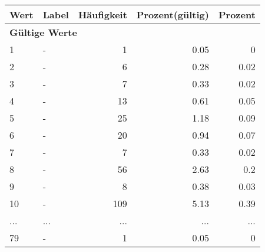      \begin{longtable}{lXrrr}
     \toprule
     \textbf{Wert} & \textbf{Label} & \textbf{Häufigkeit} & \textbf{Prozent(gültig)} & \textbf{Prozent} \\
     \endhead
     \midrule
     \multicolumn{5}{l}{\textbf{Gültige Werte}}\\
        1 & \multicolumn{1}{X}{-} & %
          \num{1} &
          \num[round-mode=places,round-precision=2]{0.05} &
          \num[round-mode=places,round-precision=2]{0} \\
        2 & \multicolumn{1}{X}{-} & %
          \num{6} &
          \num[round-mode=places,round-precision=2]{0.28} &
          \num[round-mode=places,round-precision=2]{0.02} \\
        3 & \multicolumn{1}{X}{-} & %
          \num{7} &
          \num[round-mode=places,round-precision=2]{0.33} &
          \num[round-mode=places,round-precision=2]{0.02} \\
        4 & \multicolumn{1}{X}{-} & %
          \num{13} &
          \num[round-mode=places,round-precision=2]{0.61} &
          \num[round-mode=places,round-precision=2]{0.05} \\
        5 & \multicolumn{1}{X}{-} & %
          \num{25} &
          \num[round-mode=places,round-precision=2]{1.18} &
          \num[round-mode=places,round-precision=2]{0.09} \\
        6 & \multicolumn{1}{X}{-} & %
          \num{20} &
          \num[round-mode=places,round-precision=2]{0.94} &
          \num[round-mode=places,round-precision=2]{0.07} \\
        7 & \multicolumn{1}{X}{-} & %
          \num{7} &
          \num[round-mode=places,round-precision=2]{0.33} &
          \num[round-mode=places,round-precision=2]{0.02} \\
        8 & \multicolumn{1}{X}{-} & %
          \num{56} &
          \num[round-mode=places,round-precision=2]{2.63} &
          \num[round-mode=places,round-precision=2]{0.2} \\
        9 & \multicolumn{1}{X}{-} & %
          \num{8} &
          \num[round-mode=places,round-precision=2]{0.38} &
          \num[round-mode=places,round-precision=2]{0.03} \\
        10 & \multicolumn{1}{X}{-} & %
          \num{109} &
          \num[round-mode=places,round-precision=2]{5.13} &
          \num[round-mode=places,round-precision=2]{0.39} \\
       ... & ... & ... & ... & ... \\
        79 & \multicolumn{1}{X}{-} & %
          \num{1} &
          \num[round-mode=places,round-precision=2]{0.05} &
          \num[round-mode=places,round-precision=2]{0} \\


\end{longtable}
